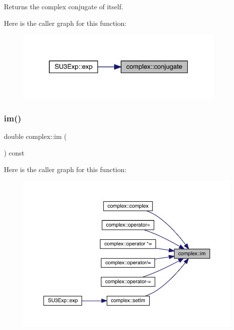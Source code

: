 \begin{DoxyReturn}{Returns}
the complex conjugate of itself. 
\end{DoxyReturn}
Here is the caller graph for this function\+:\nopagebreak
\begin{figure}[H]
\begin{center}
\leavevmode
\includegraphics[width=293pt]{classcomplex_af21a3dae4577a3aab8e1105a1b919b81_icgraph}
\end{center}
\end{figure}
\mbox{\label{classcomplex_a450461dea92da7f72b96402edafd07c2}} 
\subsubsection{\texorpdfstring{im()}{im()}}
{\footnotesize\ttfamily double complex\+::im (\begin{DoxyParamCaption}{ }\end{DoxyParamCaption}) const\hspace{0.3cm}{\ttfamily [inline]}}

Here is the caller graph for this function\+:\nopagebreak
\begin{figure}[H]
\begin{center}
\leavevmode
\includegraphics[width=350pt]{classcomplex_a450461dea92da7f72b96402edafd07c2_icgraph}
\end{center}
\end{figure}
\mbox{\label{classcomplex_a81dd00af9a4f56a86bd242b31cb1f8a4}} 
